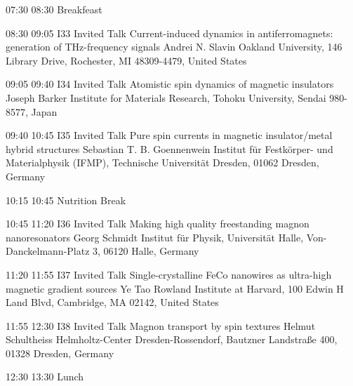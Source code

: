 \begin{confbreak}
{07:30}
{08:30}
{Breakfeast}
\end{confbreak}

 

\begin{talk}
{08:30}
{09:05}
{I33}
{Invited Talk}
{Current-induced dynamics in antiferromagnets: generation of THz-frequency signals}
{Andrei N. Slavin}
{Oakland University, 146 Library Drive, Rochester, MI  48309-4479, United States}
\end{talk}

\begin{talk}
{09:05}
{09:40}
{I34}
{Invited Talk}
{Atomistic spin dynamics of magnetic insulators}
{Joseph Barker}
{Institute for Materials Research, Tohoku University, Sendai 980-8577, Japan}
\end{talk}

\begin{talk}
{09:40}
{10:45}
{I35}
{Invited Talk}
{Pure spin currents in magnetic insulator/metal hybrid structures}
{Sebastian T. B. Goennenwein}
{Institut f\"{u}r Festk\"{o}rper- und Materialphysik (IFMP), Technische Universit\"{a}t Dresden, 01062 Dresden, Germany}
\end{talk}

\begin{confbreak}
{10:15}
{10:45}
{Nutrition Break}
\end{confbreak}

\begin{talk}
{10:45}
{11:20}
{I36}
{Invited Talk}
{Making high quality freestanding magnon nanoresonators}
{Georg Schmidt}
{Institut für Physik, Universität Halle, Von-Danckelmann-Platz 3, 06120 Halle, Germany}
\end{talk}

\begin{talk}
{11:20}
{11:55}
{I37}
{Invited Talk}
{Single-crystalline FeCo nanowires as ultra-high magnetic gradient sources}
{Ye Tao}
{Rowland Institute at Harvard, 100 Edwin H Land Blvd, Cambridge, MA 02142, United States}
\end{talk}

\begin{talk}
{11:55}
{12:30}
{I38}
{Invited Talk}
{Magnon transport by spin textures}
{Helmut Schultheiss}
{Helmholtz-Center Dresden-Rossendorf, Bautzner Landstraße 400, 01328 Dresden, Germany}
\end{talk}

\begin{confbreak}
{12:30}
{13:30}
{Lunch}
\end{confbreak}

